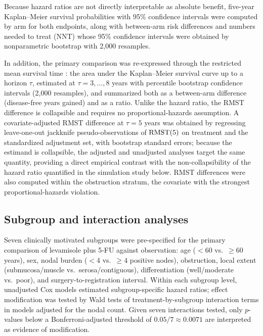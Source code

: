 Because hazard ratios are not directly interpretable as absolute
benefit, five-year Kaplan--Meier survival probabilities with 95\%
confidence intervals were computed by arm for both endpoints, along with
between-arm risk differences and numbers needed to treat (NNT) whose 95\%
confidence intervals were obtained by nonparametric bootstrap with
2{,}000 resamples.

In addition, the primary comparison was re-expressed through the
restricted mean survival time \citep{royston2011,uno2014}: the area
under the Kaplan--Meier survival curve up to a horizon $\tau$, estimated
at $\tau = 3,\ldots,8$ years with percentile bootstrap confidence
intervals (2{,}000 resamples), and summarized both as a between-arm
difference (disease-free years gained) and as a ratio. Unlike the hazard
ratio, the RMST difference is collapsible and requires no
proportional-hazards assumption. A covariate-adjusted RMST difference at
$\tau = 5$ years was obtained by regressing leave-one-out jackknife
pseudo-observations of $\mathrm{RMST}(5)$
\citep{andersen2003,parner2010} on treatment and the standardized
adjustment set, with bootstrap standard errors; because the estimand is
collapsible, the adjusted and unadjusted analyses target the same
quantity, providing a direct empirical contrast with the
non-collapsibility of the hazard ratio quantified in the simulation
study below. RMST differences were also computed within the obstruction
stratum, the covariate with the strongest proportional-hazards
violation.

\subsection{Subgroup and interaction analyses}

Seven clinically motivated subgroups were pre-specified for the primary
comparison of levamisole plus 5-FU against observation: age ($<60$
vs.\ $\geqslant 60$ years), sex, nodal burden ($<4$ vs.\ $\geq 4$
positive nodes), obstruction, local extent (submucosa/muscle vs.\
serosa/contiguous), differentiation (well/moderate vs.\ poor), and
surgery-to-registration interval. Within each subgroup level, unadjusted
Cox models estimated subgroup-specific hazard ratios; effect modification
was tested by Wald tests of treatment-by-subgroup interaction terms in
models adjusted for the nodal count. Given seven interactions tested,
only $p$-values below a Bonferroni-adjusted threshold of $0.05/7 \approx
0.0071$ are interpreted as evidence of modification.


